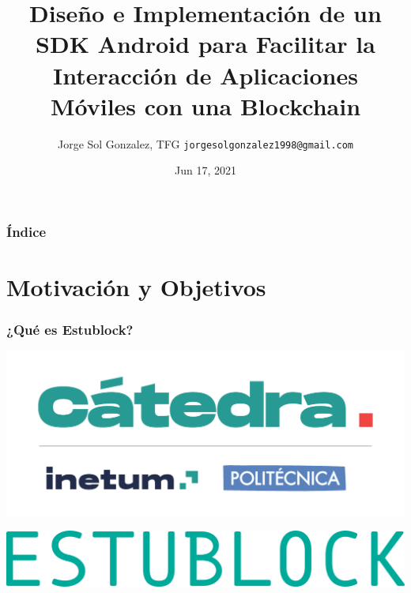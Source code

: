 \documentclass[usenames,dvipsnames]{beamer}
\title[SDK Android para Comunicar con Redes Blockchain]{\LARGE Diseño e Implementación de un SDK Android para Facilitar la Interacción de Aplicaciones Móviles con una Blockchain}
\date[Jun 2021]{Jun 17, 2021}
\author[Jorge Sol Gonzalez]{
  Jorge Sol Gonzalez, TFG
  \pdfnewline
  \texttt{jorgesolgonzalez1998@gmail.com}
}
\institute{ETSI Informáticos, Universidad Politécnica de Madrid}
\begin{document}
\begin{frame}
\titlepage
\end{frame}

\begin{frame}
\frametitle{Índice} 
\tableofcontents
\end{frame}





\section{Motivación y Objetivos}
\begin{frame} 
\frametitle{¿Qué es Estublock?} 
  \begin{center}
    \includegraphics[scale=0.50]{graphics/logo_catedra}
  \end{center}
  \begin{center}
    \includegraphics[scale=0.25]{graphics/texto_estublock}
  \end{center}
\end{frame}
\end{document}
